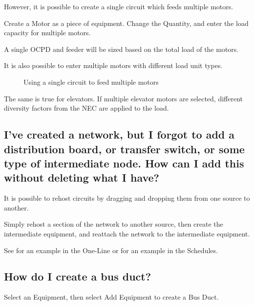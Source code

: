 \documentclass[letterpaper,10pt,english]{sphinxmanual}
\begin{document}
However, it is possible to create a single circuit which feeds multiple motors.

Create a Motor as a piece of equipment.  Change the Quantity, and enter the load capacity for multiple motors.

A single OCPD and feeder will be sized based on the total load of the motors.

It is also possible to enter multiple motors with different load unit types.

\begin{figure}[H]
\centering
\capstart

\noindent{}
\caption{Using a single circuit to feed multiple motors}\label{\detokenize{docs/faq:id3}}\end{figure}

The same is true for elevators.  If multiple elevator motors are selected, different diversity factors from the NEC are applied to the load.


\subsection{I’ve created a network, but I forgot to add a distribution board, or transfer switch, or some type of intermediate node.  How can I add this without deleting what I have?}
\label{\detokenize{docs/faq:i-ve-created-a-network-but-i-forgot-to-add-a-distribution-board-or-transfer-switch-or-some-type-of-intermediate-node-how-can-i-add-this-without-deleting-what-i-have}}
It is possible to rehost circuits by dragging and dropping them from one source to another.

Simply rehost a section of the network to another source, then create the intermediate equipment, and reattach the network to the intermediate equipment.

See {\hyperref[\detokenize{docs/userguide/buildingelectricalmodel/one-line/index-one-line:one-line-rehosting}]{}} for an example in the One-Line or {\hyperref[\detokenize{docs/userguide/buildingelectricalmodel/schedules/index-schedules:schedules-rehosting}]{}} for an example in the Schedules.


\subsection{How do I create a bus duct?}
\label{\detokenize{docs/faq:how-do-i-create-a-bus-duct}}
Select an Equipment, then select Add Equipment to create a Bus Duct.
\end{document}
